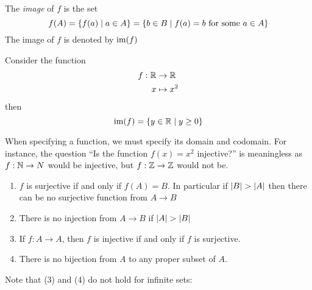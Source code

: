 \documentclass{article}
\begin{document}
\begin{defi}[Image]
    The \emph{image} of $f$ is the set
    \[
        f(A) = \left\{ f(a) \mid a \in A \right\} = \left\{ b \in B \mid f(a) = b \text{ for some } a \in A \right\}  
    \]
    The image of $f$ is denoted by $\operatorname{im}(f)$
\end{defi}
\begin{eg}
    Consider the function
    \begin{align*}
        f: \mathbb{R} &\rightarrow \mathbb{R} \\
        x &\mapsto x^2
    \end{align*}
    then 
    \[
        \operatorname{im}(f) = \left\{ y \in \mathbb{R} \mid y \geq 0 \right\}  
    \]
\end{eg}
\begin{warning}
    When specifying a function, we must specify its domain and codomain. 
    For instance, the question ``Is the function $f(x) = x^2$ injective?'' is meaningless as
    $f: \mathbb{N} \rightarrow N$ would be injective, but $f: \mathbb{Z} \rightarrow \mathbb{Z}$ would not be.
\end{warning}
\begin{remark}\leavevmode
    \begin{enumerate}[label=(\arabic*)]
        \item $f$ is surjective if and only if $f(A) = B$. 
        In particular if $\left\lvert B\right\rvert > \left\lvert A\right\rvert$ then there can be no surjective function from $A \rightarrow B$

        \item There is no injection from $A \rightarrow B$ if $\left\lvert A\right\rvert > \left\lvert B\right\rvert$
        \item If $f: A \rightarrow A$, then $f$ is injective if and only if $f$ is surjective.
        \item There is no bijection from $A$ to any proper subset of $A$.
    \end{enumerate}
\end{remark}
Note that (3) and (4) do not hold for infinite sets:
\end{document}
